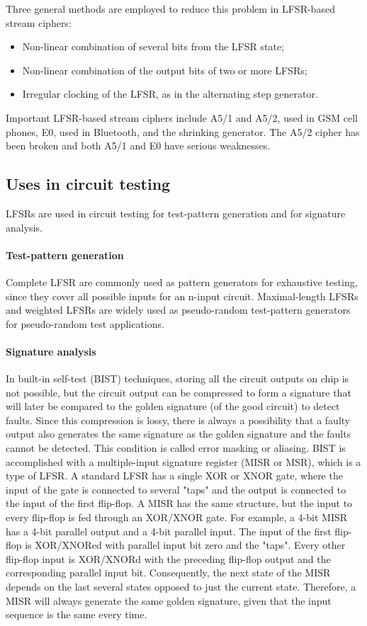 \documentclass[11pt,a4paper,oneside, openright]{article}
\begin{document}
Three general methods are employed to reduce this problem in LFSR-based stream ciphers:
\begin{itemize}
    \item Non-linear combination of several bits from the LFSR state;
    \item Non-linear combination of the output bits of two or more LFSRs;
    \item Irregular clocking of the LFSR, as in the alternating step generator.
\end{itemize}

Important LFSR-based stream ciphers include A5/1 and A5/2, used in GSM cell phones, E0, used in Bluetooth, and the shrinking generator. The A5/2 cipher has been broken and both A5/1 and E0 have serious weaknesses.

\subsection{Uses in circuit testing}
LFSRs are used in circuit testing for test-pattern generation and for signature analysis.

\paragraph{Test-pattern generation}
Complete LFSR are commonly used as pattern generators for exhaustive testing, since they cover all possible inputs for an n-input circuit. Maximal-length LFSRs and weighted LFSRs are widely used as pseudo-random test-pattern generators for pseudo-random test applications.

\paragraph{Signature analysis}
In built-in self-test (BIST) techniques, storing all the circuit outputs on chip is not possible, but the circuit output can be compressed to form a signature that will later be compared to the golden signature (of the good circuit) to detect faults. Since this compression is lossy, there is always a possibility that a faulty output also generates the same signature as the golden signature and the faults cannot be detected. This condition is called error masking or aliasing. BIST is accomplished with a multiple-input signature register (MISR or MSR), which is a type of LFSR. A standard LFSR has a single XOR or XNOR gate, where the input of the gate is connected to several "taps" and the output is connected to the input of the first flip-flop. A MISR has the same structure, but the input to every flip-flop is fed through an XOR/XNOR gate. For example, a 4-bit MISR has a 4-bit parallel output and a 4-bit parallel input. The input of the first flip-flop is XOR/XNORed with parallel input bit zero and the "taps". Every other flip-flop input is XOR/XNORd with the preceding flip-flop output and the corresponding parallel input bit. Consequently, the next state of the MISR depends on the last several states opposed to just the current state. Therefore, a MISR will always generate the same golden signature, given that the input sequence is the same every time.
\end{document}
